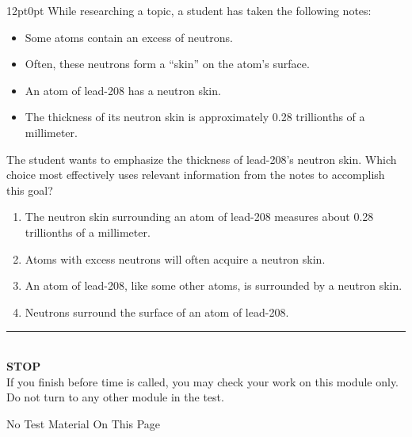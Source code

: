 \documentclass[11pt, twocolumn]{article}
\newcounter{questionnum}
\begin{document}
\vspace{6pt}\noindent
\begin{minipage}{\columnwidth}\raggedright
\noindent{}\par\vspace{8pt}
\begin{adjustwidth}{12pt}{0pt}
While researching a topic, a student has taken the following notes: 

\begin{itemize}

\item Some atoms contain an excess of neutrons.

\item Often, these neutrons form a ``skin'' on the atom's surface.

\item An atom of lead-208 has a neutron skin.

\item The thickness of its neutron skin is approximately 0.28 trillionths of a millimeter.

\end{itemize}
\vspace{6pt}

The student wants to emphasize the thickness of lead-208's neutron skin. Which choice most effectively uses relevant information from the notes to accomplish this goal?
\begin{enumerate}[label=\Alph*),leftmargin=18pt,topsep=3pt,itemsep=2pt]
  \item The neutron skin surrounding an atom of lead-208 measures about 0.28 trillionths of a millimeter.
  \item Atoms with excess neutrons will often acquire a neutron skin.
  \item An atom of lead-208, like some other atoms, is surrounded by a neutron skin.
  \item Neutrons surround the surface of an atom of lead-208.
\end{enumerate}
\end{adjustwidth}
\end{minipage}\par
\onecolumn
\thispagestyle{plainpage}
\vfill
\begin{center}
\rule{0.8\textwidth}{0.5pt}\\[6pt]
{\large\textbf{STOP}}\\[4pt]
{\small If you finish before time is called, you may check your work on this module only.\\
Do not turn to any other module in the test.}
\end{center}
\onecolumn
\newpage
\thispagestyle{plainpage}
\begin{center}
\vspace*{3in}
{\large No Test Material On This Page}
\end{center}
\end{document}
